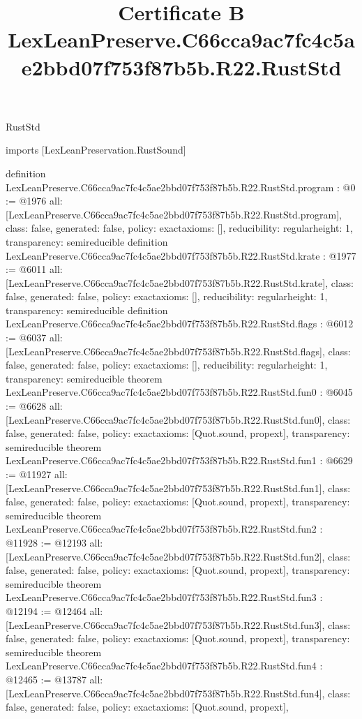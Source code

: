 \begin{lexlean}{RustStd}
\title{Certificate B LexLeanPreserve.C66cca9ac7fc4c5ae2bbd07f753f87b5b.R22.RustStd}
\begin{coremodule}
imports [LexLeanPreservation.RustSound]

definition LexLeanPreserve.C66cca9ac7fc4c5ae2bbd07f753f87b5b.R22.RustStd.program : @0 := @1976 {
  all: [LexLeanPreserve.C66cca9ac7fc4c5ae2bbd07f753f87b5b.R22.RustStd.program],
  class: false,
  generated: false,
  policy: exact{axioms: []},
  reducibility: regular{height: 1},
  transparency: semireducible
}
definition LexLeanPreserve.C66cca9ac7fc4c5ae2bbd07f753f87b5b.R22.RustStd.krate : @1977 := @6011 {
  all: [LexLeanPreserve.C66cca9ac7fc4c5ae2bbd07f753f87b5b.R22.RustStd.krate],
  class: false,
  generated: false,
  policy: exact{axioms: []},
  reducibility: regular{height: 1},
  transparency: semireducible
}
definition LexLeanPreserve.C66cca9ac7fc4c5ae2bbd07f753f87b5b.R22.RustStd.flags : @6012 := @6037 {
  all: [LexLeanPreserve.C66cca9ac7fc4c5ae2bbd07f753f87b5b.R22.RustStd.flags],
  class: false,
  generated: false,
  policy: exact{axioms: []},
  reducibility: regular{height: 1},
  transparency: semireducible
}
theorem LexLeanPreserve.C66cca9ac7fc4c5ae2bbd07f753f87b5b.R22.RustStd.fun0 : @6045 := @6628 {
  all: [LexLeanPreserve.C66cca9ac7fc4c5ae2bbd07f753f87b5b.R22.RustStd.fun0],
  class: false,
  generated: false,
  policy: exact{axioms: [Quot.sound, propext]},
  transparency: semireducible
}
theorem LexLeanPreserve.C66cca9ac7fc4c5ae2bbd07f753f87b5b.R22.RustStd.fun1 : @6629 := @11927 {
  all: [LexLeanPreserve.C66cca9ac7fc4c5ae2bbd07f753f87b5b.R22.RustStd.fun1],
  class: false,
  generated: false,
  policy: exact{axioms: [Quot.sound, propext]},
  transparency: semireducible
}
theorem LexLeanPreserve.C66cca9ac7fc4c5ae2bbd07f753f87b5b.R22.RustStd.fun2 : @11928 := @12193 {
  all: [LexLeanPreserve.C66cca9ac7fc4c5ae2bbd07f753f87b5b.R22.RustStd.fun2],
  class: false,
  generated: false,
  policy: exact{axioms: [Quot.sound, propext]},
  transparency: semireducible
}
theorem LexLeanPreserve.C66cca9ac7fc4c5ae2bbd07f753f87b5b.R22.RustStd.fun3 : @12194 := @12464 {
  all: [LexLeanPreserve.C66cca9ac7fc4c5ae2bbd07f753f87b5b.R22.RustStd.fun3],
  class: false,
  generated: false,
  policy: exact{axioms: [Quot.sound, propext]},
  transparency: semireducible
}
theorem LexLeanPreserve.C66cca9ac7fc4c5ae2bbd07f753f87b5b.R22.RustStd.fun4 : @12465 := @13787 {
  all: [LexLeanPreserve.C66cca9ac7fc4c5ae2bbd07f753f87b5b.R22.RustStd.fun4],
  class: false,
  generated: false,
  policy: exact{axioms: [Quot.sound, propext]},
}
\end{coremodule}
\end{lexlean}
